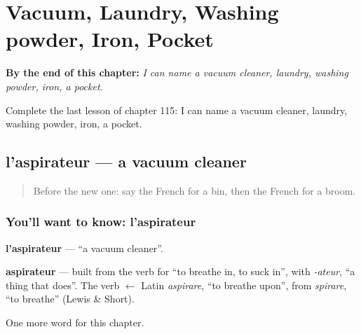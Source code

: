 
\chapter{Vacuum, Laundry, Washing powder, Iron, Pocket}
\label{ch:fr-vacuum-cleaner-laundry-washing-powder-iron-pocket}

\begin{chapteropening}
\textbf{By the end of this chapter:} \emph{I can name a vacuum cleaner, laundry, washing powder, iron, a pocket.}

Complete the last lesson of chapter 115: I can name a vacuum cleaner, laundry, washing powder, iron, a pocket.
\end{chapteropening}

\section[l'aspirateur]{l'aspirateur — a vacuum cleaner}

\label{lesson:FR-C115-aspirateur}



\begin{quote}
Before the new one: say the French for a bin, then the French for a broom.
\end{quote}

\subsection*{You'll want to know: l'aspirateur}
\textbf{l'aspirateur} — \textquotedblleft{}a vacuum cleaner\textquotedblright{}.

\begin{cousinweb}
\textbf{aspirateur} — built from the verb for \textquotedblleft{}to breathe in, to suck in\textquotedblright{}, with \emph{-ateur}, \textquotedblleft{}a thing that does\textquotedblright{}. The verb $\leftarrow$ Latin \emph{aspirare}, \textquotedblleft{}to breathe upon\textquotedblright{}, from \emph{spirare}, \textquotedblleft{}to breathe\textquotedblright{} (Lewis \& Short).
\end{cousinweb}

\begin{grammarlens}[title={What you've built}]
One more word for this chapter.
\end{grammarlens}

